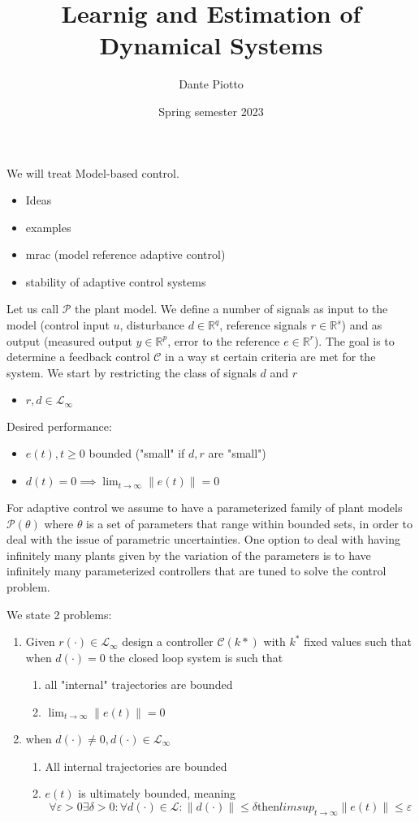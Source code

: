 \documentclass{book}
\title{Learnig and Estimation of Dynamical Systems}
\author{Dante Piotto}
\date{Spring semester 2023}
\begin{document}
We will treat Model-based control. 

\begin{itemize}
    \item Ideas 
    \item examples
    \item mrac (model reference adaptive control) 
    \item stability of adaptive control systems
\end{itemize}

Let us call $\mathcal{P}$ the plant model. We define a number of signals as input to the model (control input $u$, disturbance $d\in \mathbb{R}^q$, reference signals $r\in\mathbb{R}^s$) and as output (measured output $y\in\mathbb{R}^p$, error to the reference $e\in\mathbb{R}^r$). The goal is to determine a feedback control $\mathcal{C}$ in a way st certain criteria are met for the system. We start by restricting the class of signals $d$ and $r$ 
\begin{itemize}
    \item $r,d \in \mathcal{L}_{\infty}$
\end{itemize}
Desired performance: 
\begin{itemize}
    \item $e(t),t\geq0$ bounded ("small" if $d,r$ are "small")
    \item $d(t)=0 \implies \lim_{t\to\infty}\|e(t)\|=0$
\end{itemize}

For adaptive control we assume to have a parameterized family of plant models $\mathcal{P}(\theta)$ where $\theta$ is a set of parameters that range within bounded sets, in order to deal with the issue of parametric uncertainties. One option to deal with having infinitely many plants given by the variation of the parameters is to have infinitely many parameterized controllers that are tuned to solve the control problem.

We state 2 problems: 
\begin{enumerate}
    \item Given $r(\cdot)\in\mathcal{L}_\infty$ design a controller $\mathcal{C}(k*)$ with $k^*$ fixed values such that when $d(\cdot)=0$ the closed loop system is such that \begin{enumerate}
            \item all "internal" trajectories are bounded 
            \item $\lim_{t\to\infty}\|e(t)\|=0$
        \end{enumerate} 
    \item when $d(\cdot)\neq 0,d(\cdot)\in \mathcal{L}_\infty$ \begin{enumerate}
            \item All internal trajectories are bounded 
            \item $e(t)$ is ultimately bounded, meaning 
                \[
                    \forall \varepsilon>0 \exists \delta>0 :\forall d(\cdot)\in\mathcal{L}:\|d(\cdot)\|\leq\delta \text{then} limsup_{t\to\infty}\|e(t)\|\leq \varepsilon
                \]
        \end{enumerate}
\end{enumerate}
\end{document}
